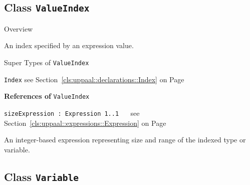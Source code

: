 \subsection{Class \bfseries \texttt{ValueIndex}\normalfont}
\label{cls:uppaal::declarations::ValueIndex} 
	
	\begin{longdescription}
		\item[Overview] 		
				

	

		An index specified by an expression value.		
		\item[Super Types of \texttt{ValueIndex}] ~
			\begin{longdescription}
				\item[\texttt{Index}] see Section~\ref{cls:uppaal::declarations::Index} on Page~\pageref{cls:uppaal::declarations::Index}						\end{longdescription}
		
	
			\item[\textbf{References of} \texttt{ValueIndex}] ~
			\begin{longdescription}
	\item[\texttt{sizeExpression : Expression 	\symbol{"5B}1..1\symbol{"5D}
}] ~
	see Section~\ref{cls:uppaal::expressions::Expression} on Page~\pageref{cls:uppaal::expressions::Expression}
	
	\nopagebreak
		
				

	

		An integer-based expression representing size and range of the indexed type or variable.		
			\end{longdescription}
	
	\end{longdescription}
	

\subsection{Class \bfseries \texttt{Variable}\normalfont}
\label{cls:uppaal::declarations::Variable} 
	
